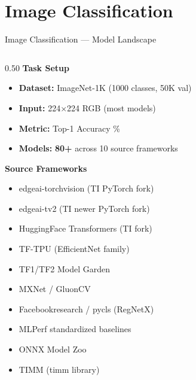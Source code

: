 \documentclass[aspectratio=169,12pt]{beamer}
\newcommand{\highlight}[1]{\textcolor{TIRed}{\textbf{#1}}}
\begin{document}
\section{Image Classification}

\begin{frame}{Image Classification --- Model Landscape}
  \begin{columns}[T]
    \begin{column}{0.50\textwidth}
      \textbf{Task Setup}
      \begin{itemize}\footnotesize
        \item \textbf{Dataset:} ImageNet-1K (1000 classes, 50K val)
        \item \textbf{Input:} 224×224 RGB (most models)
        \item \textbf{Metric:} Top-1 Accuracy \%
        \item \textbf{Models:} \highlight{80+} across 10 source frameworks
      \end{itemize}

      \vspace{0.3cm}
      \textbf{Source Frameworks}
      \begin{itemize}\scriptsize
        \item edgeai-torchvision (TI PyTorch fork)
        \item edgeai-tv2 (TI newer PyTorch fork)
        \item HuggingFace Transformers (TI fork)
        \item TF-TPU (EfficientNet family)
        \item TF1/TF2 Model Garden
        \item MXNet / GluonCV
        \item Facebookresearch / pycls (RegNetX)
        \item MLPerf standardized baselines
        \item ONNX Model Zoo
        \item TIMM (timm library)
      \end{itemize}
    \end{column}


\end{columns}
\end{frame}
\end{document}
